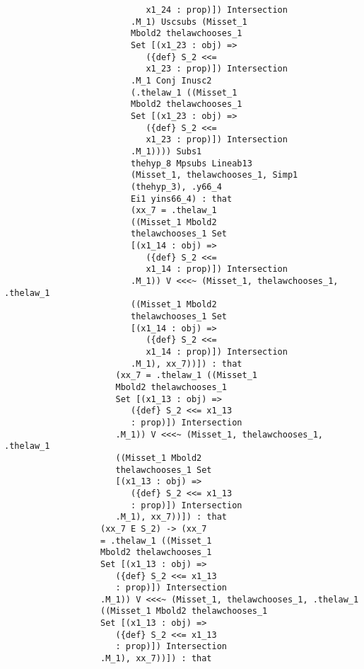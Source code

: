 \documentclass{article}
\begin{document}
\begin{verbatim}
                            x1_24 : prop)]) Intersection 
                         .M_1) Uscsubs (Misset_1 
                         Mbold2 thelawchooses_1 
                         Set [(x1_23 : obj) => 
                            ({def} S_2 <<= 
                            x1_23 : prop)]) Intersection 
                         .M_1 Conj Inusc2 
                         (.thelaw_1 ((Misset_1 
                         Mbold2 thelawchooses_1 
                         Set [(x1_23 : obj) => 
                            ({def} S_2 <<= 
                            x1_23 : prop)]) Intersection 
                         .M_1)))) Subs1 
                         thehyp_8 Mpsubs Lineab13 
                         (Misset_1, thelawchooses_1, Simp1 
                         (thehyp_3), .y66_4 
                         Ei1 yins66_4) : that 
                         (xx_7 = .thelaw_1 
                         ((Misset_1 Mbold2 
                         thelawchooses_1 Set 
                         [(x1_14 : obj) => 
                            ({def} S_2 <<= 
                            x1_14 : prop)]) Intersection 
                         .M_1)) V <<<~ (Misset_1, thelawchooses_1, .thelaw_1 
                         ((Misset_1 Mbold2 
                         thelawchooses_1 Set 
                         [(x1_14 : obj) => 
                            ({def} S_2 <<= 
                            x1_14 : prop)]) Intersection 
                         .M_1), xx_7))]) : that 
                      (xx_7 = .thelaw_1 ((Misset_1 
                      Mbold2 thelawchooses_1 
                      Set [(x1_13 : obj) => 
                         ({def} S_2 <<= x1_13 
                         : prop)]) Intersection 
                      .M_1)) V <<<~ (Misset_1, thelawchooses_1, .thelaw_1 
                      ((Misset_1 Mbold2 
                      thelawchooses_1 Set 
                      [(x1_13 : obj) => 
                         ({def} S_2 <<= x1_13 
                         : prop)]) Intersection 
                      .M_1), xx_7))]) : that 
                   (xx_7 E S_2) -> (xx_7 
                   = .thelaw_1 ((Misset_1 
                   Mbold2 thelawchooses_1 
                   Set [(x1_13 : obj) => 
                      ({def} S_2 <<= x1_13 
                      : prop)]) Intersection 
                   .M_1)) V <<<~ (Misset_1, thelawchooses_1, .thelaw_1 
                   ((Misset_1 Mbold2 thelawchooses_1 
                   Set [(x1_13 : obj) => 
                      ({def} S_2 <<= x1_13 
                      : prop)]) Intersection 
                   .M_1), xx_7))]) : that 

\end{verbatim}
\end{document}
